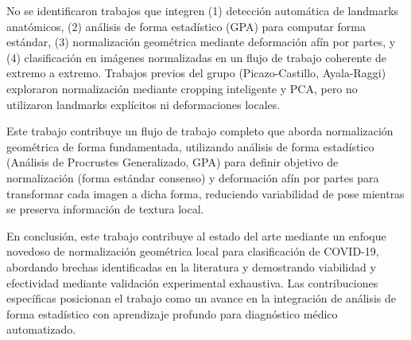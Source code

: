No se identificaron trabajos que integren (1) detección automática de landmarks anatómicos, (2) análisis de forma estadístico (GPA) para computar forma estándar, (3) normalización geométrica mediante deformación afín por partes, y (4) clasificación en imágenes normalizadas en un flujo de trabajo coherente de extremo a extremo. Trabajos previos del grupo (Picazo-Castillo, Ayala-Raggi) exploraron normalización mediante cropping inteligente y PCA, pero no utilizaron landmarks explícitos ni deformaciones locales.

Este trabajo contribuye un flujo de trabajo completo que aborda normalización geométrica de forma fundamentada, utilizando análisis de forma estadístico (Análisis de Procrustes Generalizado, GPA) \cite{gower1975generalized,dryden2016statistical} para definir objetivo de normalización (forma estándar consenso) y deformación afín por partes para transformar cada imagen a dicha forma, reduciendo variabilidad de pose mientras se preserva información de textura local.

En conclusión, este trabajo contribuye al estado del arte mediante un enfoque novedoso de normalización geométrica local para clasificación de COVID-19, abordando brechas identificadas en la literatura y demostrando viabilidad y efectividad mediante validación experimental exhaustiva. Las contribuciones específicas posicionan el trabajo como un avance en la integración de análisis de forma estadístico con aprendizaje profundo para diagnóstico médico automatizado.

